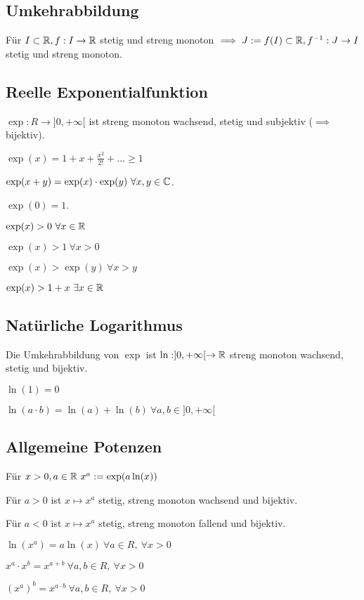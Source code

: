 \subsection{Umkehrabbildung}
Für $I \subset \mathbb{R}, f: I \to \mathbb{R}$ stetig und streng monoton $\implies J:=f(I) \subset \mathbb{R}, f^{-1}:  J \to I$ stetig und streng monoton.

\subsection{Reelle Exponentialfunktion}
$\exp: R \to ]0, +\infty[$ ist streng monoton wachsend, stetig und subjektiv ($\implies$ bijektiv).
\begin{compactitem}
    \item $\exp(x) = 1 + x + \frac{x^2}{2!} + \dots \ge 1$
    \item $\exp(x + y ) = \exp(x) \cdot \exp(y) \ \forall x,y \in \C$.
    \item $\exp(0) = 1$.
    \item $\exp(x) > 0 \ \forall x \in \mathbb{R}$
    \item $\exp(x) > 1 \ \forall x > 0$
    \item $\exp(x) > \exp(y) \ \forall x > y$
    \item $\exp(x) > 1 + x \ \exists x \in \mathbb{R}$
\end{compactitem}

\subsection{Natürliche Logarithmus}
Die Umkehrabbildung von $\exp$ ist $\ln: ]0, +\infty[ \to \mathbb{R}$ streng monoton wachsend, stetig und bijektiv.
\begin{compactitem}
    \item $\ln(1) = 0$
    \item $\ln(a \cdot b) = \ln(a) + \ln(b) \ \forall a,b \in ]0, +\infty[$
\end{compactitem}

\subsection{Allgemeine Potenzen}
Für $x > 0, a \in \mathbb{R} \ x^a := \exp(a \ln(x))$
\begin{compactitem}
    \item Für $a > 0$ ist $x \mapsto x^a$ stetig, streng monoton wachsend und bijektiv.
    \item Für $a < 0$ ist $x \mapsto x^a$ stetig, streng monoton fallend und bijektiv.
    \item $\ln(x^a) = a \ln(x) \ \forall a \in R, \ \forall x > 0$
    \item $x^a \cdot x ^b = x^{a + b} \ \forall a,b \in R, \ \forall x > 0$
    \item $(x^a)^b = x^{a \cdot b} \ \forall a,b \in R, \ \forall x > 0$
\end{compactitem}

